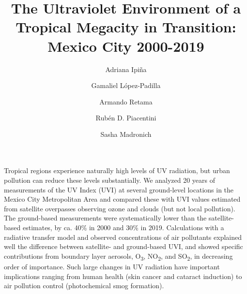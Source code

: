 \documentclass[10pt]{article}
\renewenvironment{abstract}
  {{\bfseries\noindent{\abstractname}\par\nobreak}\footnotesize}
  {\bigskip}
\begin{document}
\title{The Ultraviolet Environment of a Tropical Megacity in Transition: Mexico
City 2000-2019}


\author[1,2]{Adriana Ipiña}
\author[3]{Gamaliel López-Padilla}
\author[4]{Armando Retama}
\author[1]{Rubén D. Piacentini}
\author[5]{Sasha Madronich}



\vspace{-1em}



  \date{}


\begingroup
\let\center\flushleft
\let\endcenter\endflushleft
\maketitle
\endgroup


\linenumbers



\doublespacing


\begin{abstract}
Tropical regions experience naturally high levels of UV radiation, but
urban pollution can reduce these levels substantially. We analyzed 20
years of measurements of the UV Index (UVI) at several ground-level
locations in the Mexico City Metropolitan Area and compared these with
UVI values estimated from satellite overpasses observing ozone and
clouds (but not local pollution). The ground-based measurements were
systematically lower than the satellite-based estimates, by ca. 40\% in
2000 and 30\% in 2019. Calculations with a radiative transfer model and
observed concentrations of air pollutants explained well the difference
between satellite- and ground-based UVI, and showed specific
contributions from boundary layer aerosols, O\textsubscript{3},
NO\textsubscript{2}, and SO\textsubscript{2}, in decreasing order of
importance. Such large changes in UV radiation have important
implications ranging from human health (skin cancer and cataract
induction) to air pollution control (photochemical smog formation).%
\end{abstract}%
\end{document}
